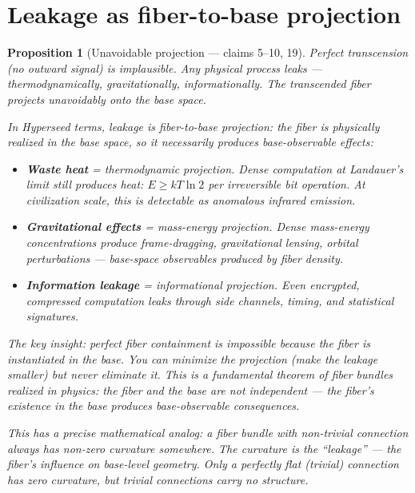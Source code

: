 \documentclass[11pt,a4paper]{article}
\newtheorem{proposition}[definition]{Proposition}
\begin{document}
\section{Leakage as fiber-to-base projection}
\label{sec:leakage}

\begin{proposition}[Unavoidable projection --- claims 5--10, 19]
\label{prop:leakage}
Perfect transcension (no outward signal) is implausible. Any physical
process leaks --- thermodynamically, gravitationally, informationally.
The transcended fiber projects unavoidably onto the base space.

In Hyperseed terms, leakage is \emph{fiber-to-base projection}: the
fiber is physically realized in the base space, so it necessarily
produces base-observable effects:
\begin{itemize}
\item \textbf{Waste heat} = thermodynamic projection. Dense computation
  at Landauer's limit still produces heat: $E \geq kT \ln 2$ per
  irreversible bit operation. At civilization scale, this is detectable
  as anomalous infrared emission.
\item \textbf{Gravitational effects} = mass-energy projection. Dense
  mass-energy concentrations produce frame-dragging, gravitational
  lensing, orbital perturbations --- base-space observables produced
  by fiber density.
\item \textbf{Information leakage} = informational projection. Even
  encrypted, compressed computation leaks through side channels, timing,
  and statistical signatures.
\end{itemize}

The key insight: perfect fiber containment is impossible because the
fiber is \emph{instantiated in} the base. You can minimize the
projection (make the leakage smaller) but never eliminate it. This is
a fundamental theorem of fiber bundles realized in physics: the fiber
and the base are not independent --- the fiber's existence in the base
produces base-observable consequences.

This has a precise mathematical analog: a fiber bundle with non-trivial
connection always has non-zero curvature somewhere. The curvature is
the ``leakage'' --- the fiber's influence on base-level geometry. Only
a perfectly flat (trivial) connection has zero curvature, but trivial
connections carry no structure.
\end{proposition}
\end{document}
